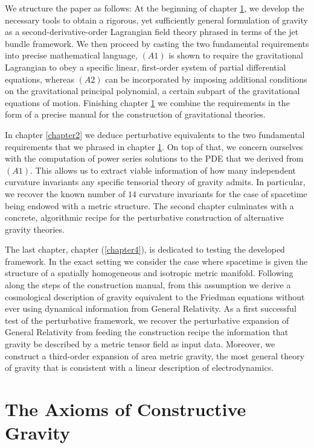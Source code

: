 \documentclass[%
preprint,
titlepage,
nofootinbib,
amsmath,amssymb,
showkeys,
aps,
prd,
floatfix,
]{revtex4-2}
\begin{document}
We structure the paper as follows: 
At the beginning of chapter \ref{chapter1}, we develop the necessary tools to obtain a rigorous, yet sufficiently general formulation of gravity as a second-derivative-order Lagrangian field theory phrased in terms of the jet bundle framework. We then proceed by casting the two fundamental requirements into precise mathematical language, $(A1)$ is shown to require the gravitational Lagrangian to obey a specific linear, first-order system of partial differential equations, whereas $(A2)$ can be incorporated by imposing additional conditions on the gravitational principal polynomial, a certain subpart of the gravitational equations of motion. Finishing chapter \ref{chapter1} we combine the requirements in the form of a precise manual for the construction of gravitational theories.

In chapter \ref{chapter2} we deduce perturbative equivalents to the two fundamental requirements that we phrased in chapter \ref{chapter1}. On top of that, we concern ourselves with the computation of power series solutions to the PDE that we derived from $(A1)$. This allows us to extract viable information of how many independent curvature invariants any specific tensorial theory of gravity admits. In particular, we recover the known number of $14$ curvature invariants for the case of spacetime being endowed with a metric structure. 
The second chapter culminates with a concrete, algorithmic recipe for the perturbative construction of alternative gravity theories. 

The last chapter, chapter (\ref{chapter4}), is dedicated to testing the developed framework. In the exact setting we consider the case where spacetime is given the structure of a spatially homogeneous and isotropic metric manifold. Following along the steps of the construction manual, from this assumption we derive a cosmological description of gravity equivalent to the Friedman equations without ever using dynamical information from General Relativity.
As a first successful test of the perturbative framework, we recover the perturbative expansion of General Relativity from feeding the construction recipe the information that gravity be described by a metric tensor field as input data.
Moreover, we construct a third-order expansion of area metric gravity, the most general theory of gravity that is consistent with a linear description of electrodynamics.

\section{The Axioms of Constructive Gravity}\label{chapter1}
\end{document}
